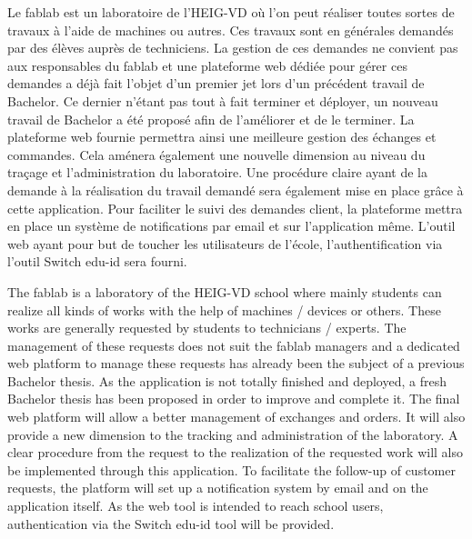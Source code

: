 Le fablab est un laboratoire de l'HEIG-VD où l'on peut réaliser toutes sortes de travaux à l'aide de machines ou autres. Ces travaux sont en générales demandés par des élèves auprès de techniciens. La gestion de ces demandes ne convient pas aux responsables du fablab et une plateforme web dédiée pour gérer ces demandes a déjà fait l'objet d'un premier jet lors d'un précédent travail de Bachelor. Ce dernier n'étant pas tout à fait terminer et déployer, un nouveau travail de Bachelor a été proposé afin de l'améliorer et de le terminer.\newline
La plateforme web fournie permettra ainsi une meilleure gestion des échanges et commandes.\newline
Cela aménera également une nouvelle dimension au niveau du traçage et l'administration du laboratoire.\newline
Une procédure claire ayant de la demande à la réalisation du travail demandé sera également mise en place grâce à cette application.\newline
Pour faciliter le suivi des demandes client, la plateforme mettra en place un système de notifications par email et sur l'application même.\newline
L'outil web ayant pour but de toucher les utilisateurs de l'école, l'authentification via l'outil Switch edu-id sera fourni.\newline

\asterism

The fablab is a laboratory of the HEIG-VD school where mainly students can realize all kinds of works with the help of machines / devices or others. These works are generally requested by students to technicians / experts. The management of these requests does not suit the fablab managers and a dedicated web platform to manage these requests has already been the subject of a previous Bachelor thesis. As the application is not totally finished and deployed, a fresh Bachelor thesis has been proposed in order to improve and complete it.\newline
The final web platform will allow a better management of exchanges and orders.\newline
It will also provide a new dimension to the tracking and administration of the laboratory.\newline
A clear procedure from the request to the realization of the requested work will also be implemented through this application.\newline
To facilitate the follow-up of customer requests, the platform will set up a notification system by email and on the application itself.\newline
As the web tool is intended to reach school users, authentication via the Switch edu-id tool will be provided.\newline